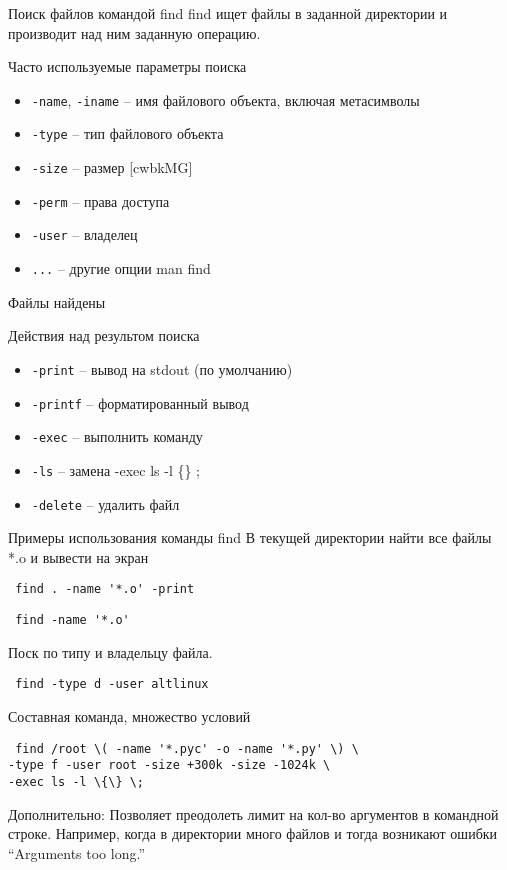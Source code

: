 \begin{frame}[fragile]{Поиск файлов командой find}
    \alert{find} ищет файлы в заданной директории и производит над ним заданную операцию.
	\begin{block}{Часто используемые параметры поиска}
		\begin{itemize}
			\item {\tt -name}, {\tt -iname} -- имя файлового объекта, включая метасимволы 
			\item {\tt -type} -- тип файлового объекта
			\item {\tt -size} -- размер [cwbkMG]
			\item {\tt -perm} -- права доступа
			\item {\tt -user} -- владелец
			\item {\tt ...} -- другие опции man find 
		\end{itemize}
	\end{block}
\end{frame}

\begin{frame}[fragile]{Файлы найдены}
	\begin{block}{Действия над результом поиска}
		\begin{itemize}
			\item {\tt -print} -- вывод на stdout (по умолчанию)
			\item {\tt -printf} -- форматированный вывод
			\item {\tt -exec} -- выполнить команду
			\item {\tt -ls} -- замена -exec ls -l \{\} ;
			\item {\tt -delete} -- удалить файл
		\end{itemize}
	\end{block}
\end{frame}

\begin{frame}[fragile]{Примеры использования команды find}
            В текущей директории найти все файлы *.o и вывести на экран 
            \begin{verbatim} find . -name '*.o' -print \end{verbatim}
            \begin{verbatim} find -name '*.o' \end{verbatim}
            Поск по типу и владельцу файла.
            \begin{verbatim} find -type d -user altlinux \end{verbatim}
            Составная команда, множество условий
            \begin{verbatim} find /root \( -name '*.pyc' -o -name '*.py' \) \
-type f -user root -size +300k -size -1024k \
-exec ls -l \{\} \; \end{verbatim}
 Дополнительно:
 Позволяет преодолеть лимит на кол-во аргументов в командной строке. 
 Например, когда в директории много файлов и тогда возникают ошибки
 \textquotedblleft Arguments too long.\textquotedblright 
\end{frame}

